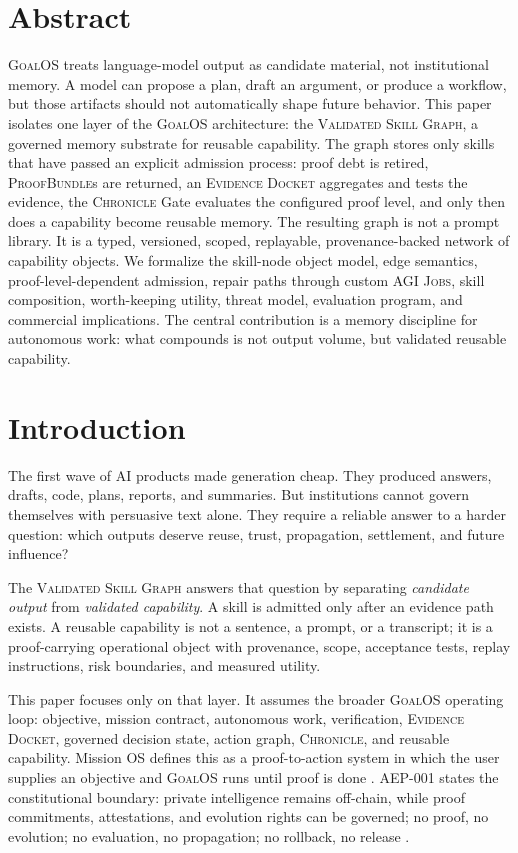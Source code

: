 \documentclass[10.5pt]{article}
\theoremstyle{goThm}
\newcommand{\vsg}{\textsc{Validated Skill Graph}}
\newcommand{\chronicle}{\textsc{Chronicle}}
\newcommand{\goalos}{\textsc{GoalOS}}
\newcommand{\pb}{\textsc{ProofBundle}}
\newcommand{\ed}{\textsc{Evidence Docket}}
\newcommand{\jobs}{\textsc{AGI Jobs}}
\begin{document}
\section{Abstract}
\goalos{} treats language-model output as candidate material, not institutional memory. A model can propose a plan, draft an argument, or produce a workflow, but those artifacts should not automatically shape future behavior. This paper isolates one layer of the \goalos{} architecture: the \vsg{}, a governed memory substrate for reusable capability. The graph stores only skills that have passed an explicit admission process: proof debt is retired, \pb{}s are returned, an \ed{} aggregates and tests the evidence, the \chronicle{} Gate evaluates the configured proof level, and only then does a capability become reusable memory. The resulting graph is not a prompt library. It is a typed, versioned, scoped, replayable, provenance-backed network of capability objects. We formalize the skill-node object model, edge semantics, proof-level-dependent admission, repair paths through custom \jobs{}, skill composition, worth-keeping utility, threat model, evaluation program, and commercial implications. The central contribution is a memory discipline for autonomous work: what compounds is not output volume, but validated reusable capability.

\section{Introduction}
The first wave of AI products made generation cheap. They produced answers, drafts, code, plans, reports, and summaries. But institutions cannot govern themselves with persuasive text alone. They require a reliable answer to a harder question: which outputs deserve reuse, trust, propagation, settlement, and future influence?

The \vsg{} answers that question by separating \emph{candidate output} from \emph{validated capability}. A skill is admitted only after an evidence path exists. A reusable capability is not a sentence, a prompt, or a transcript; it is a proof-carrying operational object with provenance, scope, acceptance tests, replay instructions, risk boundaries, and measured utility.

This paper focuses only on that layer. It assumes the broader \goalos{} operating loop: objective, mission contract, autonomous work, verification, \ed{}, governed decision state, action graph, \chronicle{}, and reusable capability. Mission OS defines this as a proof-to-action system in which the user supplies an objective and \goalos{} runs until proof is done \cite{goalosMissionOS}. AEP-001 states the constitutional boundary: private intelligence remains off-chain, while proof commitments, attestations, and evolution rights can be governed; no proof, no evolution; no evaluation, no propagation; no rollback, no release \cite{aep001}.
\end{document}
